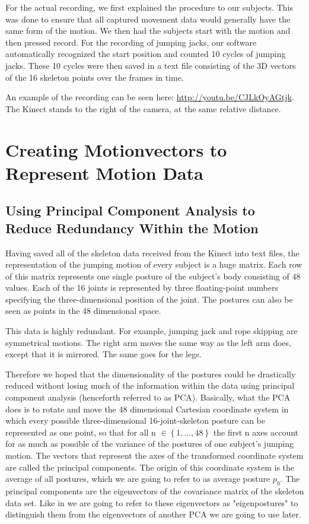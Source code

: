 \documentclass[a4paper]{article}
\begin{document}
For the actual recording, we first explained the procedure to our subjects.
This was done to ensure that all captured movement data would generally have the same form of the motion.
We then had the subjects start with the motion and then pressed record.
For the recording of jumping jacks, our software automatically recognized the start position and counted 10 cycles of jumping jacks.
These 10 cycles were then saved in a text file consisting of the 3D vectors of the 16 skeleton points over the frames in time.

An example of the recording can be seen here: \url{http://youtu.be/CJLkOyAGtjk}. The Kinect stands to the right of the camera, at the same relative distance.

\section{Creating Motionvectors to Represent Motion Data}

\subsection{Using Principal Component Analysis to Reduce Redundancy Within the Motion}

Having saved all of the skeleton data received from the Kinect into text files, the representation of the jumping motion of every subject is a huge matrix.
Each row of this matrix represents one single posture of the subject's body consisting of 48 values.
Each of the 16 joints is represented by three floating-point numbers specifying the three-dimensional position of the joint.
The postures can also be seen as points in the 48 dimensional space.

This data is highly redundant.
For example, jumping jack and rope skipping are symmetrical motions.
The right arm moves the same way as the left arm does, except that it is mirrored.
The same goes for the legs.

Therefore we hoped that the dimensionality of the postures could be drastically reduced without losing much of the information within the data using principal component analysis (henceforth referred to as PCA).
Basically, what the PCA does is to rotate and move the 48 dimensional Cartesian coordinate system in which every possible three-dimensional 16-joint-skeleton posture can be represented as one point, so that for all n $\in \left\{1, ..., 48\right\}$ the first n axes account for as much as possible of the variance of the postures of one subject's jumping motion.
The vectors that represent the axes of the transformed coordinate system are called the principal components.
The origin of this coordinate system is the average of all postures, which we are going to refer to as average posture $p_{0}$.
The principal components are the eigenvectors of the covariance matrix of the skeleton data set.
Like in \cite{origin} we are going to refer to these eigenvectors as "eigenpostures" to distinguish them from the eigenvectors of another PCA we are going to use later.
\end{document}
